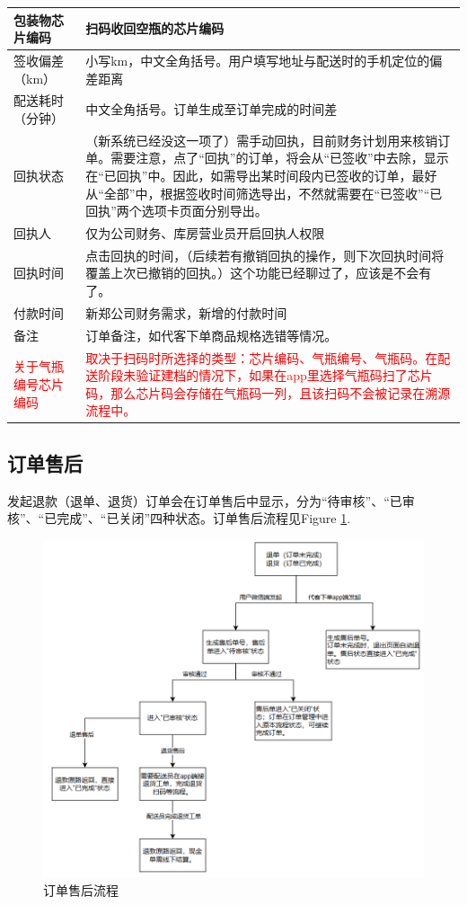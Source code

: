 \documentclass[UTF8]{ctexart}
\begin{document}
\begin{longtable}[h!]{ | m{3cm} | m{12cm} | }
		\hline
		包装物芯片编码& 扫码收回空瓶的芯片编码\\
		\hline
		签收偏差（km）& 小写km，中文全角括号。用户填写地址与配送时的手机定位的偏差距离\\
		\hline
		配送耗时（分钟）& 中文全角括号。订单生成至订单完成的时间差\\
		\hline
		回执状态& （新系统已经没这一项了）需手动回执，目前财务计划用来核销订单。需要注意，点了“回执”的订单，将会从“已签收”中去除，显示在“已回执”中。因此，如需导出某时间段内已签收的订单，最好从“全部”中，根据签收时间筛选导出，不然就需要在“已签收”“已回执”两个选项卡页面分别导出。\\
		\hline
		回执人	& 仅为公司财务、库房营业员开启回执人权限 \\
		\hline
		回执时间& 点击回执的时间，（后续若有撤销回执的操作，则下次回执时间将覆盖上次已撤销的回执。）这个功能已经聊过了，应该是不会有了。\\
		\hline
		付款时间& 新郑公司财务需求，新增的付款时间\\
		\hline
		备注& 订单备注，如代客下单商品规格选错等情况。\\
		\hline
		\textcolor{red}{关于气瓶编号芯片编码}& \textcolor{red}{取决于扫码时所选择的类型：芯片编码、气瓶编号、气瓶码。在配送阶段未验证建档的情况下，如果在app里选择气瓶码扫了芯片码，那么芯片码会存储在气瓶码一列，且该扫码不会被记录在溯源流程中。}\\
		\hline

\end{longtable}


\subsection{订单售后}

发起退款（退单、退货）订单会在订单售后中显示，分为“待审核”、“已审核”、“已完成”、“已关闭”四种状态。订单售后流程见Figure \ref{fig:chargeback}.

\begin{figure}[h]
	\centering
	\includegraphics[width=1\linewidth]{dlh_tutorial_figs/chargeback}
	\caption{订单售后流程}
	\label{fig:chargeback}
\end{figure}
\end{document}
